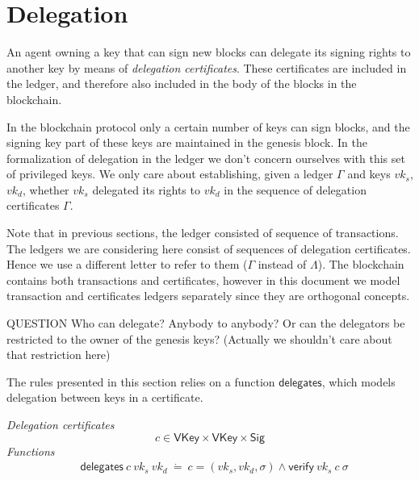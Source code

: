 \documentclass[11pt,a4paper]{article}
\newenvironment{question}
  {\begin{bclogo}[logo=\bcquestion, couleur=orange!10, arrondi=0.2]{ QUESTION}}
  {\end{bclogo}}
\newcommand{\var}[1]{\mathit{#1}}
\newcommand{\fun}[1]{\mathsf{#1}}
\newcommand{\type}[1]{\mathsf{#1}}
\newcommand{\VKey}{\type{VKey}}
\newcommand{\Sig}{\type{Sig}}
\newcommand{\verify}[3]{\fun{verify} ~ #1 ~ #2 ~ #3}
\newcommand{\delegatesName}{\fun{delegates}}
\newcommand{\delegates}[3]{\delegatesName~#1~#2~#3}
\begin{document}
\section{Delegation}
\label{sec:delegation}

An agent owning a key that can sign new blocks can delegate its signing rights
to another key by means of \textit{delegation certificates}. These
certificates are included in the ledger, and therefore also included in the
body of the blocks in the blockchain.

In the blockchain protocol only a certain number of keys can sign blocks, and
the signing key part of these keys are maintained in the genesis block. In the
formalization of delegation in the ledger we don't concern ourselves with this
set of privileged keys. We only care about establishing, given a ledger
$\Gamma$ and keys $\var{vk}_s$, $\var{vk}_d$, whether $\var{vk}_s$ delegated
its rights to $\var{vk}_d$ in the sequence of delegation certificates $\Gamma$.

Note that in previous sections, the ledger consisted of sequence of
transactions. The ledgers we are considering here consist of sequences of
delegation certificates. Hence we use a different letter to refer to them
($\Gamma$ instead of $\Lambda$). The blockchain contains both transactions and
certificates, however in this document we model transaction and certificates
ledgers separately since they are orthogonal concepts.

\begin{question}
  Who can delegate? Anybody to anybody? Or can the delegators be restricted to
  the owner of the genesis keys? (Actually we shouldn't care about that
  restriction here)
\end{question}

The rules presented in this section relies on a function $\delegatesName$,
which models delegation between keys in a certificate.

\begin{figure*}[h]
  \emph{Delegation certificates}
  \begin{equation*}
    \var{c} \in \VKey \times \VKey \times \Sig
  \end{equation*}
  \emph{Functions}
  \begin{align*}
    & \delegates{c}{vk_s}{vk_d} ~\dot= ~ c = (vk_s, vk_d, \sigma) \wedge \verify{vk_s}{c}{\sigma}
  \end{align*}
\end{figure*}
\end{document}
